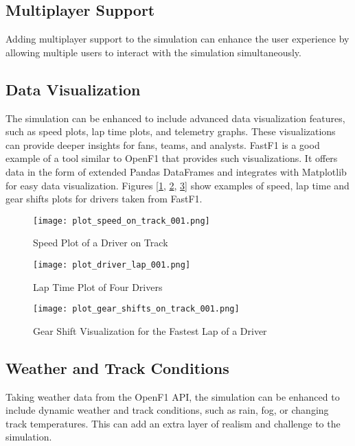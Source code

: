 \documentclass[
	a4paper, %
	10pt, %
	unnumberedsections, %
	twoside, %
]{LTJournalArticle}
\begin{document}
\subsection{Multiplayer Support}
Adding multiplayer support to the simulation can enhance the user experience by allowing multiple users to interact with the simulation simultaneously. 

\subsection{Data Visualization}
The simulation can be enhanced to include advanced data visualization features, such as speed plots, lap time plots, and telemetry graphs. These visualizations can provide deeper insights for fans, teams, and analysts. FastF1 \autocite{fastF1} is a good example of a tool similar to OpenF1 that provides such visualizations. It offers data in the form of extended Pandas DataFrames and integrates with Matplotlib for easy data visualization. Figures [\ref{fig:speed_plot}, \ref{fig:lap_time_plot}, \ref{fig:gear_shifts_plot}] show examples of speed, lap time and gear shifts plots for drivers taken from FastF1.

\begin{figure}[h]
	\texttt{[image: plot\_speed\_on\_track\_001.png]}
	\caption{Speed Plot of a Driver on Track}
    \label{fig:speed_plot}
\end{figure}

\begin{figure}[h]
    \texttt{[image: plot\_driver\_lap\_001.png]}
    \caption{Lap Time Plot of Four Drivers}
    \label{fig:lap_time_plot}
\end{figure}

\begin{figure}[h]
    \texttt{[image: plot\_gear\_shifts\_on\_track\_001.png]}
    \caption{Gear Shift Visualization for the Fastest Lap of a Driver}
    \label{fig:gear_shifts_plot}
\end{figure}

\subsection{Weather and Track Conditions}
Taking weather data from the OpenF1 API, the simulation can be enhanced to include dynamic weather and track conditions, such as rain, fog, or changing track temperatures. This can add an extra layer of realism and challenge to the simulation.
\end{document}

